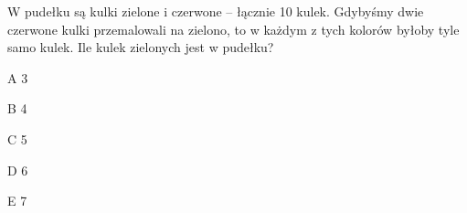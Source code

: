 \begin{tresc}
W pudełku są kulki zielone i czerwone – łącznie 10 kulek. Gdybyśmy dwie czerwone kulki przemalowali na zielono, to w każdym z tych kolorów byłoby tyle samo kulek. Ile kulek zielonych jest w pudełku?
\end{tresc}
\begin{wariant}{A} 3 \end{wariant}
\begin{wariant}{B} 4 \end{wariant}
\begin{wariant}{C} 5 \end{wariant}
\begin{wariant}{D} 6 \end{wariant}
\begin{wariant}{E} 7 \end{wariant}
